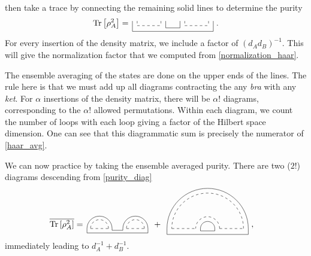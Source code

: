\documentclass[a4paper,11pt]{article}
\newcommand{\Tr}{\text{Tr}}
\newcommand*{\SR}[1]{\textcolor{magenta}{[SR: \textsf{#1}]}}
\begin{document}
then take a trace by connecting the remaining solid lines to determine the purity
\begin{align}
    \Tr\left[\rho_A^2\right]= %
    \,
    \tikz[scale=1.0,baseline=0ex]{
    \draw[dashed] (0,0.2)-- (0,0);
    \draw[dashed] (0,0) -- (1,0);
    \draw[dashed]  (1,0.2) -- (1,0);
    \draw (-0.2,0.2)-- (-0.2,-0.25);
    \draw (1.2,-0.1)-- (1.2,0.2);
    \draw[dashed] (2,0.2)-- (2,0);
    \draw[dashed] (2,0) -- (3,0);
    \draw[dashed]  (3,0.2) -- (3,0);
    \draw (1.8,0.2)-- (1.8,-0.1);
    \draw (3.2,-0.25)-- (3.2,0.2);
    \draw (1.2,-0.1)-- (1.8,-0.1);
    \draw (-0.2,-0.25) -- (3.2,-0.25);
    }\ .
    \label{purity_diag}
\end{align}
For every insertion of the density matrix, we include a factor of $(d_A d_B)^{-1}$. This will give the normalization factor that we computed from \eqref{normalization_haar}.

The ensemble averaging of the states are done on the upper ends of the lines. The rule here is that we must add up all diagrams contracting the any \textit{bra} with any \textit{ket}. For $\alpha$ insertions of the density matrix, there will be $\alpha!$ diagrams, corresponding to the $\alpha!$ allowed permutations. Within each diagram, we count the number of loops with each loop giving a factor of the Hilbert space dimension. One can see that this diagrammatic sum is precisely the numerator of \eqref{haar_avg}.

We can now practice by taking the ensemble averaged purity. There are two ($2!$) diagrams descending from \eqref{purity_diag}
\label{purity_diagram}
\begin{align}
    \overline{\Tr\left[\rho_A^2\right]} &=%
    \,
    \tikz[scale=0.75,baseline=0.5ex]{
    \draw[dashed] (0,0) -- (1,0);
    \draw (-0.2,0.)-- (-0.2,-0.25);
    \draw (1.2,-0.1)-- (1.2,0.);
    \draw[dashed] (2,0) -- (3,0);
    \draw (1.8,0.)-- (1.8,-0.1);
    \draw (3.2,-0.25)-- (3.2,0.);
    \draw (1.2,-0.1)-- (1.8,-0.1);
    \draw (-0.2,-0.25) -- (3.2,-0.25);
    \draw[dashed] (1.0,0) arc (0:180:0.5);
    \draw[dashed] (3.0,0) arc (0:180:0.5);
    \draw (1.2,0) arc (0:180:0.7);
    \draw (3.2,0) arc (0:180:0.7);
    }
\ \,
+
\ \,
    \tikz[scale=1.0,baseline=0.5ex]{
    \draw[dashed] (0,0) -- (1,0);
    \draw (-0.2,0.)-- (-0.2,-0.25);
    \draw (1.2,-0.1)-- (1.2,0.);
    \draw[dashed] (2,0) -- (3,0);
    \draw (1.8,0.)-- (1.8,-0.1);
    \draw (3.2,-0.25)-- (3.2,0.);
    \draw (1.2,-0.1)-- (1.8,-0.1);
    \draw (-0.2,-0.25) -- (3.2,-0.25);
    \draw[dashed] (2.0,0) arc (0:180:0.5);
    \draw[dashed] (3.0,0) arc (0:180:1.5);
    \draw (1.8,0) arc (0:180:0.3);
    \draw (3.2,0) arc (0:180:1.7);
    }
\ 
,
\end{align}
immediately leading to $d_A^{-1} + d_B^{-1}$.
\end{document}
